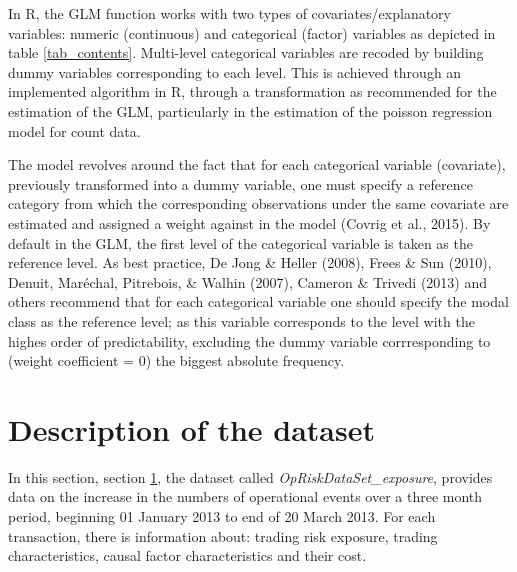 \documentclass{DissertateUSU}
\begin{document}
In R, the GLM function works with two types of covariates/explanatory
variables: numeric (continuous) and categorical (factor) variables as
depicted in table \ref{tab_contents}. Multi-level categorical variables
are recoded by building dummy variables corresponding to each level.
This is achieved through an implemented algorithm in R, through a
transformation as recommended for the estimation of the GLM,
particularly in the estimation of the poisson regression model for count
data.\medskip

The model revolves around the fact that for each categorical variable
(covariate), previously transformed into a dummy variable, one must
specify a reference category from which the corresponding observations
under the same covariate are estimated and assigned a weight against in
the model (Covrig et al., 2015). By default in the GLM, the first level
of the categorical variable is taken as the reference level. As best
practice, De Jong \& Heller (2008), Frees \& Sun (2010), Denuit,
Maréchal, Pitrebois, \& Walhin (2007), Cameron \& Trivedi (2013) and
others recommend that for each categorical variable one should specify
the modal class as the reference level; as this variable corresponds to
the level with the highes order of predictability, excluding the dummy
variable corrresponding to (weight coefficient = \(0\)) the biggest
absolute frequency.

\section{Description of the dataset}
\label{sec:Description of the dataset}

In this section, section \ref{sec:Description of the dataset}, the
dataset called \emph{OpRiskDataSet\_exposure}, provides data on the
increase in the numbers of operational events over a three month period,
beginning 01 January 2013 to end of 20 March 2013. For each transaction,
there is information about: trading risk exposure, trading
characteristics, causal factor characteristics and their cost.
\end{document}
